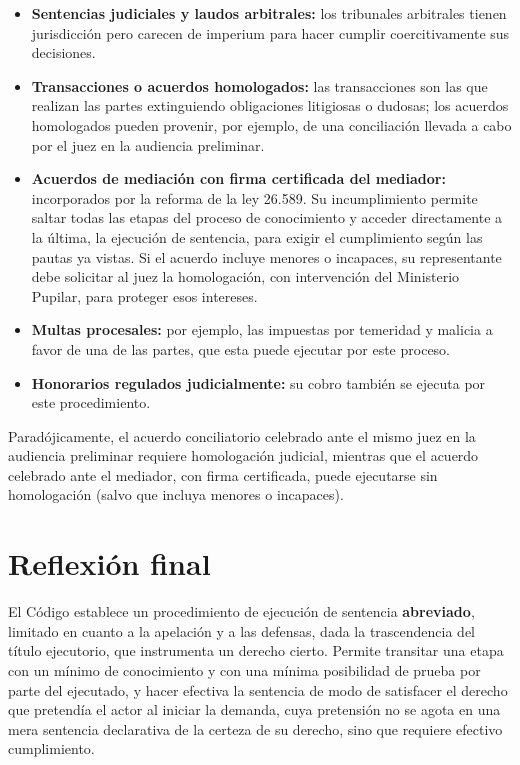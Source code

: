 \documentclass[12pt,oneside]{book}
\begin{document}
\begin{itemize}
    \item \textbf{Sentencias judiciales y laudos arbitrales:} los tribunales arbitrales tienen jurisdicción pero carecen de imperium para hacer cumplir coercitivamente sus decisiones.
    \item \textbf{Transacciones o acuerdos homologados:} las transacciones son las que realizan las partes extinguiendo obligaciones litigiosas o dudosas; los acuerdos homologados pueden provenir, por ejemplo, de una conciliación llevada a cabo por el juez en la audiencia preliminar.
    \item \textbf{Acuerdos de mediación con firma certificada del mediador:} incorporados por la reforma de la ley 26.589. Su incumplimiento permite saltar todas las etapas del proceso de conocimiento y acceder directamente a la última, la ejecución de sentencia, para exigir el cumplimiento según las pautas ya vistas. Si el acuerdo incluye menores o incapaces, su representante debe solicitar al juez la homologación, con intervención del Ministerio Pupilar, para proteger esos intereses.
    \item \textbf{Multas procesales:} por ejemplo, las impuestas por temeridad y malicia a favor de una de las partes, que esta puede ejecutar por este proceso.
    \item \textbf{Honorarios regulados judicialmente:} su cobro también se ejecuta por este procedimiento.
\end{itemize}

\begin{note}
Paradójicamente, el acuerdo conciliatorio celebrado ante el mismo juez en la audiencia preliminar requiere homologación judicial, mientras que el acuerdo celebrado ante el mediador, con firma certificada, puede ejecutarse sin homologación (salvo que incluya menores o incapaces).
\end{note}

\section{Reflexión final}

El Código establece un procedimiento de ejecución de sentencia \textbf{abreviado}, limitado en cuanto a la apelación y a las defensas, dada la trascendencia del título ejecutorio, que instrumenta un derecho cierto. Permite transitar una etapa con un mínimo de conocimiento y con una mínima posibilidad de prueba por parte del ejecutado, y hacer efectiva la sentencia de modo de satisfacer el derecho que pretendía el actor al iniciar la demanda, cuya pretensión no se agota en una mera sentencia declarativa de la certeza de su derecho, sino que requiere efectivo cumplimiento.
\end{document}
